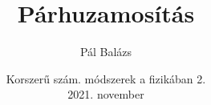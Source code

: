 \title[Párhuzamosítás]
{Párhuzamosítás}


\author[Pál Balázs]
{Pál Balázs}


\date[ELTE 2021]
{Korszerű szám. módszerek a fizikában 2.\\2021. november}

